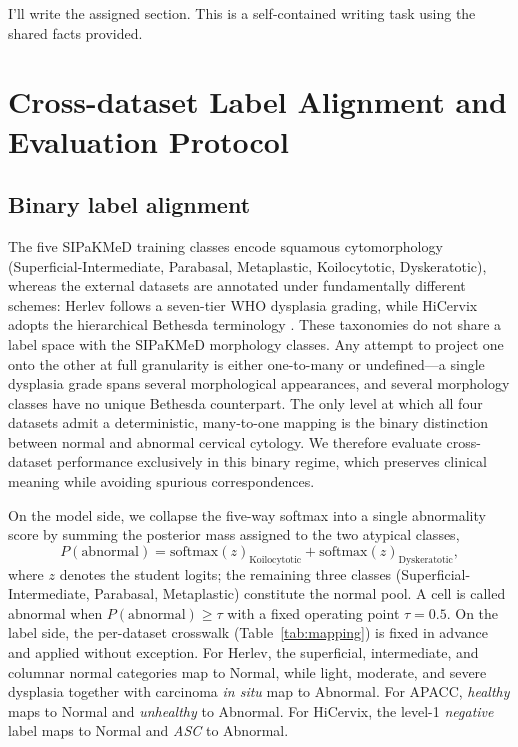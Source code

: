 I'll write the assigned section. This is a self-contained writing task using the shared facts provided.

\section{Cross-dataset Label Alignment and Evaluation Protocol}

\subsection{Binary label alignment}

The five SIPaKMeD training classes encode squamous cytomorphology (Superficial-Intermediate, Parabasal, Metaplastic, Koilocytotic, Dyskeratotic), whereas the external datasets are annotated under fundamentally different schemes: Herlev follows a seven-tier WHO dysplasia grading, while HiCervix adopts the hierarchical Bethesda terminology \citep{nayar2015bethesda}. These taxonomies do not share a label space with the SIPaKMeD morphology classes. Any attempt to project one onto the other at full granularity is either one-to-many or undefined---a single dysplasia grade spans several morphological appearances, and several morphology classes have no unique Bethesda counterpart. The only level at which all four datasets admit a deterministic, many-to-one mapping is the binary distinction between normal and abnormal cervical cytology. We therefore evaluate cross-dataset performance exclusively in this binary regime, which preserves clinical meaning while avoiding spurious correspondences.

On the model side, we collapse the five-way softmax into a single abnormality score by summing the posterior mass assigned to the two atypical classes,
\begin{equation}
P(\text{abnormal}) = \mathrm{softmax}(z)_{\text{Koilocytotic}} + \mathrm{softmax}(z)_{\text{Dyskeratotic}},
\end{equation}
where $z$ denotes the student logits; the remaining three classes (Superficial-Intermediate, Parabasal, Metaplastic) constitute the normal pool. A cell is called abnormal when $P(\text{abnormal}) \geq \tau$ with a fixed operating point $\tau = 0.5$. On the label side, the per-dataset crosswalk (Table~\ref{tab:mapping}) is fixed in advance and applied without exception. For Herlev, the superficial, intermediate, and columnar normal categories map to Normal, while light, moderate, and severe dysplasia together with carcinoma \emph{in situ} map to Abnormal. For APACC, \emph{healthy} maps to Normal and \emph{unhealthy} to Abnormal. For HiCervix, the level-1 \emph{negative} label maps to Normal and \emph{ASC} to Abnormal.

